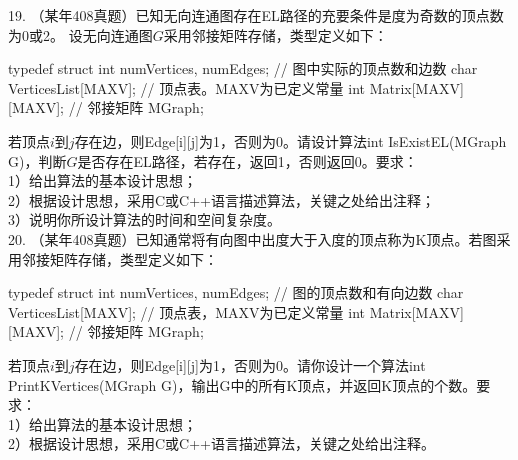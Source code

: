 \vspace{\baselineskip}

19. （某年408真题）已知无向连通图存在EL路径的充要条件是度为奇数的顶点数为0或2。
设无向连通图$G$采用邻接矩阵存储，类型定义如下：
\begin{cppcode}
    typedef struct {
        int numVertices, numEdges;  // 图中实际的顶点数和边数
        char VerticesList[MAXV];    // 顶点表。MAXV为已定义常量
        int Matrix[MAXV][MAXV];       // 邻接矩阵
    }MGraph;
\end{cppcode}

若顶点$i$到$j$存在边，则Edge[i][j]为1，否则为0。请设计算法int IsExistEL(MGraph G)，判断$G$是否存在EL路径，若存在，返回1，否则返回0。要求：\\
1）给出算法的基本设计思想；\\
2）根据设计思想，采用C或C++语言描述算法，关键之处给出注释；\\
3）说明你所设计算法的时间和空间复杂度。\\

20. （某年408真题）已知通常将有向图中出度大于入度的顶点称为K顶点。若图采用邻接矩阵存储，类型定义如下：
\begin{cppcode}
    typedef struct {
        int numVertices, numEdges;  // 图的顶点数和有向边数
        char VerticesList[MAXV];    // 顶点表，MAXV为已定义常量
        int Matrix[MAXV][MAXV];       // 邻接矩阵
    }MGraph;
\end{cppcode}
若顶点$i$到$j$存在边，则Edge[i][j]为1，否则为0。请你设计一个算法int PrintKVertices(MGraph G)，输出G中的所有K顶点，并返回K顶点的个数。要求：\\
1）给出算法的基本设计思想；\\
2）根据设计思想，采用C或C++语言描述算法，关键之处给出注释。\\




